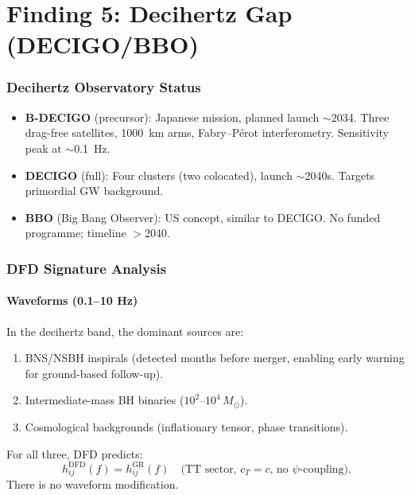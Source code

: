 \documentclass[11pt]{article}
\theoremstyle{definition}
\theoremstyle{remark}
\newcommand{\Msun}{M_\odot}
\begin{document}
\part{Finding 5: Decihertz Gap (DECIGO/BBO)}
\label{part:decihertz}

\section{Decihertz Observatory Status}

\begin{itemize}[nosep]
\item \textbf{B-DECIGO} (precursor): Japanese mission, planned launch
  $\sim$2034. Three drag-free satellites, 1000~km arms, Fabry--P\'{e}rot
  interferometry. Sensitivity peak at $\sim$0.1~Hz.
\item \textbf{DECIGO} (full): Four clusters (two colocated), launch
  $\sim$2040s. Targets primordial GW background.
\item \textbf{BBO} (Big Bang Observer): US concept, similar to DECIGO.
  No funded programme; timeline $>$2040.
\end{itemize}

\section{DFD Signature Analysis}

\subsection{Waveforms (0.1--10 Hz)}

In the decihertz band, the dominant sources are:
\begin{enumerate}[nosep]
\item BNS/NSBH inspirals (detected months before merger, enabling
  early warning for ground-based follow-up).
\item Intermediate-mass BH binaries ($10^2$--$10^4\,\Msun$).
\item Cosmological backgrounds (inflationary tensor, phase transitions).
\end{enumerate}

For all three, DFD predicts:
\begin{equation}
h_{ij}^{\mathrm{DFD}}(f) = h_{ij}^{\mathrm{GR}}(f) \quad
\text{(TT sector, } c_T = c\text{, no }\psi\text{-coupling)}.
\end{equation}
There is no waveform modification.
\end{document}
